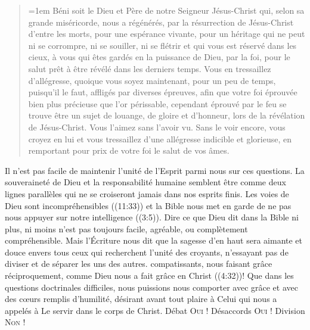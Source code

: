 \begin{quote}
\begin{digestpar}{}
\begin{pocketpar}{\emergencystretch=1em}
 \Og Béni soit le Dieu et Père de notre Seigneur Jésus-Christ qui,
 selon sa grande miséricorde, nous a régénérés, par la résurrection
 de Jésus-Christ d'entre les morts, pour une espérance vivante,
 pour un héritage qui ne peut ni se corrompre, ni se souiller,
 ni se flétrir et qui vous est réservé dans les cieux,
 à vous qui êtes gardés en la puissance de Dieu, par la foi,
 pour le salut prêt à être révélé dans les derniers temps.
 Vous en tressaillez d'allégresse, quoique vous soyez maintenant,
 pour un peu de temps, puisqu'il le faut, affligés par diverses épreuves,
 afin que votre foi éprouvée \ocadr bien plus précieuse que l'or périssable,
 cependant éprouvé par le feu \fcadr{} se trouve être un sujet de louange,
 de gloire et d'honneur, lors de la révélation de Jésus-Christ.
 Vous l'aimez sans l'avoir vu. Sans le voir encore, vous croyez en lui
 et vous tressaillez d'une allégresse indicible et glorieuse,
 en remportant pour prix de votre foi le salut de vos âmes. \Fg{}
\end{pocketpar}
\end{digestpar}
\end{quote}

\begin{digestpar}{}
\begin{pocketpar}{}
Il n'est pas facile de maintenir l'unité de l'Esprit parmi nous sur ces questions.
 La souveraineté de Dieu et la responsabilité humaine semblent être
 comme deux lignes parallèles qui ne se croiseront jamais dans nos esprits finis.
 Les voies de Dieu sont \Og incompréhensibles \Fg{} ((11:33))
 et la Bible nous met en garde de \Og ne pas nous appuyer sur notre intelligence \Fg{}
 ((3:5)).
 Dire ce que Dieu dit dans la Bible \ocadr ni plus, ni moins \fcadr{} n'est pas
 toujours facile, agréable, ou complètement compréhensible.
 Mais l'Écriture nous dit que la sagesse d'en haut sera aimante
 et douce envers tous ceux qui recherchent l'unité des croyants,
 n'essayant pas de diviser et de séparer les uns des autres.
 compatissants, nous faisant grâce réciproquement,
 comme Dieu nous a fait grâce en Christ ((4:32))!
 Que dans les questions doctrinales difficiles, nous puissions nous comporter
 avec grâce et avec des cœurs remplis d'humilité, désirant avant tout
 plaire à Celui qui nous a appelés à Le servir dans le corps de Christ.
 Débat \ocadr \textsc{Oui} !
 Désaccords \ocadr \textsc{Oui} ! \pocketlinebreak
 Division \ocadr \textsc{Non} !
\end{pocketpar}
\end{digestpar}

